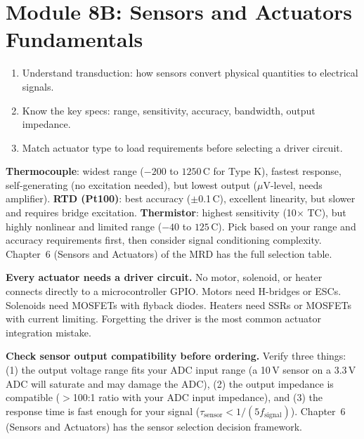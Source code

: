 \documentclass[11pt,letterpaper]{article}
\begin{document}
\section{Module 8B: Sensors and Actuators Fundamentals}

\begin{priorities}
\begin{enumerate}[leftmargin=*, itemsep=1pt, topsep=0pt]
    \item Understand transduction: how sensors convert physical quantities to electrical signals.
    \item Know the key specs: range, sensitivity, accuracy, bandwidth, output impedance.
    \item Match actuator type to load requirements before selecting a driver circuit.
\end{enumerate}
\end{priorities}

\begin{faqbox}
\textbf{Thermocouple}: widest range ($-200$ to $1250$\,\textdegree{}C for Type K), fastest response, self-generating (no excitation needed), but lowest output ($\mu$V-level, needs amplifier). \textbf{RTD (Pt100)}: best accuracy ($\pm$0.1\,\textdegree{}C), excellent linearity, but slower and requires bridge excitation. \textbf{Thermistor}: highest sensitivity (10$\times$ TC), but highly nonlinear and limited range ($-40$ to $125$\,\textdegree{}C). Pick based on your range and accuracy requirements first, then consider signal conditioning complexity. Chapter~6 (Sensors and Actuators) of the MRD has the full selection table.
\end{faqbox}

\begin{warnbox}
\textbf{Every actuator needs a driver circuit.} No motor, solenoid, or heater connects directly to a microcontroller GPIO. Motors need H-bridges or ESCs. Solenoids need MOSFETs with flyback diodes. Heaters need SSRs or MOSFETs with current limiting. Forgetting the driver is the most common actuator integration mistake.
\end{warnbox}

\begin{protip}
\textbf{Check sensor output compatibility before ordering.} Verify three things: (1) the output voltage range fits your ADC input range (a 10\,V sensor on a 3.3\,V ADC will saturate and may damage the ADC), (2) the output impedance is compatible ($>$100:1 ratio with your ADC input impedance), and (3) the response time is fast enough for your signal ($\tau_{\text{sensor}} < 1/(5 f_{\text{signal}})$). Chapter~6 (Sensors and Actuators) has the sensor selection decision framework.
\end{protip}
\end{document}
